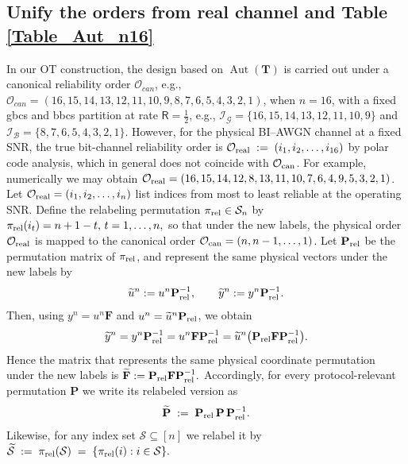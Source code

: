 \documentclass[onecolumn]{IEEEtran} %
\newcommand{\bA}{\mathbf A}
\newcommand{\bP}{\mathbf P}
\newcommand{\bF}{\mathbf F}
\newcommand{\bQ}{\mathbf Q}
\newcommand{\1}{\mathbbm{1}}
\DeclareMathOperator{\Aut}{Aut}
\theoremstyle{boldremark}
\newcommand{\bT}{\mathbf{T}}
\begin{document}
\subsection{Unify the orders from real channel and Table \ref{Table_Aut_n16}} \label{Sec_unify_order}
In our OT construction, the design based on $\Aut(\bT)$ is carried out under a canonical reliability order $ \mathcal{O}_{can}$, e.g., $\mathcal{O}_{can}=(16,15,14,13,12,11,10,9,8,7,6,5,4,3,2,1)$, when $n=16$, with a fixed \gls{gbcs} and \gls{bbcs} partition at rate $\textsf{R}=\tfrac12$, e.g., $\mathcal{I}_{\mathcal{G}} = \{16,15,14,13,12,11,10,9\}$ and $\mathcal{I}_{\mathcal{B}} = \{8,7,6,5,4,3,2,1\}.$ However, for the physical BI--AWGN channel at a fixed SNR, the {true} bit-channel reliability order is $\mathcal{O}_{\rm real} \;:=\; (i_1,i_2,\dots,i_{16})$ by polar code analysis, which in general does not coincide with $\mathcal{O}_{\rm can}$. For example, numerically we may obtain $\mathcal{O}_{\rm real}=(16,15,14,12,8,13,11,10,7,6,4,9,5,3,2,1)$. Let $\mathcal{O}_{\rm real}=(i_1,i_2,\dots,i_n)$ list indices from most to least reliable at the operating SNR. Define the relabeling permutation
$\pi_{\rm rel}\in\mathcal{S}_n$ by $ \pi_{\rm rel}(i_t)=n+1-t,\, t=1,\dots,n,$ so that under the new labels, the physical order $\mathcal{O}_{\rm real}$ is
mapped to the canonical order $\mathcal{O}_{\rm can}=(n,n-1,\dots,1)$. Let \(\bP_{\rm rel}\) be the permutation matrix of \(\pi_{\rm rel}\), and represent
the same physical vectors under the new labels by
\[
\widetilde{u}^n := u^n\bP_{\rm rel}^{-1},
\qquad
\widetilde{y}^n := y^n\bP_{\rm rel}^{-1}.
\]
Then, using \(y^n=u^n\bF\) and \(u^n=\widetilde{u}^n\bP_{\rm rel}\), we obtain
\[
\widetilde{y}^n
= y^n\bP_{\rm rel}^{-1}
= u^n\bF\bP_{\rm rel}^{-1}
= \widetilde{u}^n \bigl(\bP_{\rm rel}\bF\bP_{\rm rel}^{-1}\bigr).
\]
Hence the matrix that represents the same physical coordinate permutation under the
new labels is
\(
\widetilde{\bF} := \bP_{\rm rel}\bF\bP_{\rm rel}^{-1}.
\) Accordingly, for every protocol-relevant permutation $\bP$ we write its relabeled
version as 
\begin{align}\label{EQ_conjugation}
  \widetilde{\bP} \;:=\; \bP_{\rm rel}\,\bP\,\bP_{\rm rel}^{-1}.
\end{align}
Likewise, for any index set $\mathcal{S}\subseteq[n]$ we relabel it by
$  \widetilde{\mathcal{S}} \;:=\; \pi_{\rm rel}(\mathcal{S})  \;=\;\{\pi_{\rm rel}(i): i\in\mathcal{S}\}.$




\end{document}
